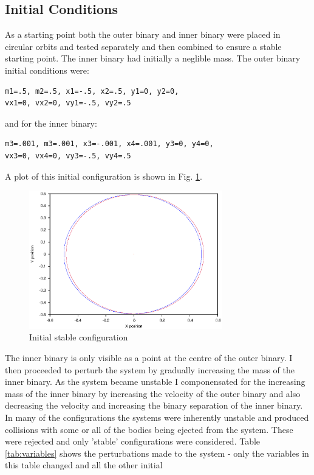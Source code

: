 \documentclass[a4paper,12pt]{article}
\begin{document}
\subsection{Initial Conditions}
As a starting point both the outer binary and inner binary were placed in circular orbits and tested separately and then combined to ensure a stable
starting point. The inner binary had initially a neglible mass.
The outer binary initial conditions were:
\begin{lstlisting}
m1=.5, m2=.5, x1=-.5, x2=.5, y1=0, y2=0,
vx1=0, vx2=0, vy1=-.5, vy2=.5
\end{lstlisting}
and for the inner binary:
\begin{lstlisting}
m3=.001, m3=.001, x3=-.001, x4=.001, y3=0, y4=0, 
vx3=0, vx4=0, vy3=-.5, vy4=.5
\end{lstlisting}
A plot of this initial configuration is shown in Fig. \ref{fig:stablebase}.
\begin{figure}[H]
\centering
\includegraphics[width=0.75\textwidth]{./results/stablebase/Orbit.eps}
\caption{Initial stable configuration}
\label{fig:stablebase}
\end{figure}
The inner binary is only visible as a point at the centre of the outer binary.
I then proceeded to perturb the system by gradually increasing the mass of the inner binary. As the system became unstable I componensated for
the increasing mass of the inner binary by increasing the velocity of the outer binary and also decreasing the velocity and increasing the binary 
separation of the inner binary. In many of the configurations the systems were inherently unstable and produced collisions with some 
or all of the bodies being ejected from the system. These were rejected and only 'stable' configurations were considered.
Table \ref{tab:variables} shows the perturbations made to the system - only the variables in this table changed and all the other initial
\end{document}
